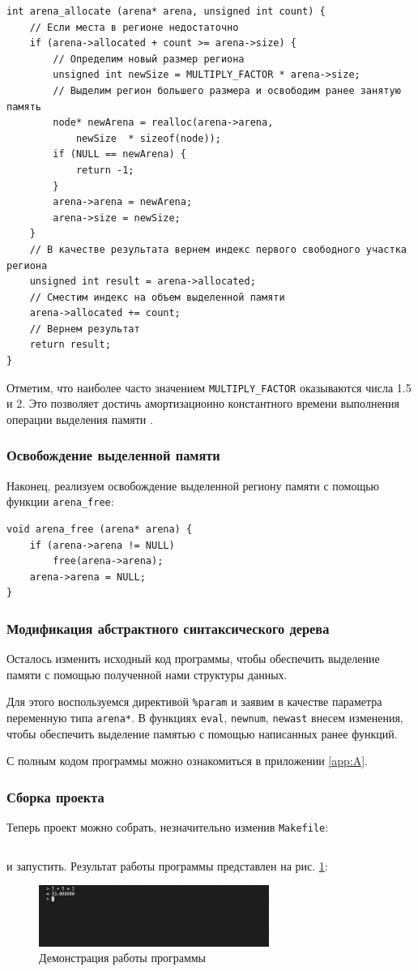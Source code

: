 \begin{verbatim} 
int arena_allocate (arena* arena, unsigned int count) {
    // Если места в регионе недостаточно
    if (arena->allocated + count >= arena->size) {
        // Определим новый размер региона
        unsigned int newSize = MULTIPLY_FACTOR * arena->size;
        // Выделим регион большего размера и освободим ранее занятую память
        node* newArena = realloc(arena->arena, 
            newSize  * sizeof(node));
        if (NULL == newArena) {
            return -1;
        }
        arena->arena = newArena;
        arena->size = newSize;
    }
    // В качестве результата вернем индекс первого свободного участка региона
    unsigned int result = arena->allocated;
    // Сместим индекс на объем выделенной памяти
    arena->allocated += count;
    // Вернем результат
    return result;
}
\end{verbatim}

Отметим, что наиболее часто значением \verb|MULTIPLY_FACTOR| оказываются числа
1.5 и 2. Это позволяет достичь амортизационно константного времени выполнения
операции выделения памяти \cite{facebook}.

\subsubsection{Освобождение выделенной памяти}
Наконец, реализуем освобождение выделенной региону памяти с помощью функции
\verb|arena_free|:

\begin{verbatim}
void arena_free (arena* arena) {
    if (arena->arena != NULL)
        free(arena->arena);
    arena->arena = NULL;
}
\end{verbatim}

\subsubsection{Модификация абстрактного синтаксического дерева}
Осталось изменить исходный код программы, чтобы обеспечить выделение памяти с
помощью полученной нами структуры данных.

Для этого воспользуемся директивой \verb|%param| и заявим в качестве параметра
переменную типа \verb|arena*|. В функциях \verb|eval|, \verb|newnum|,
\verb|newast| внесем изменения, чтобы обеспечить выделение памятью с помощью
написанных ранее функций.

С полным кодом программы можно ознакомиться в приложении \ref{app:A}.

\subsubsection{Сборка проекта}
Теперь проект можно собрать, незначительно изменив \verb|Makefile|:
\inputminted{Makefile}{Makefile} 
\noindent  и запустить. Результат работы программы представлен на рис.
\ref{fig:test}:

\begin{figure}[H]
    \centering
    \includegraphics[width=0.67\textwidth]{naivetest.png}
    \caption{Демонстрация работы программы}
    \label{fig:test}
\end{figure}